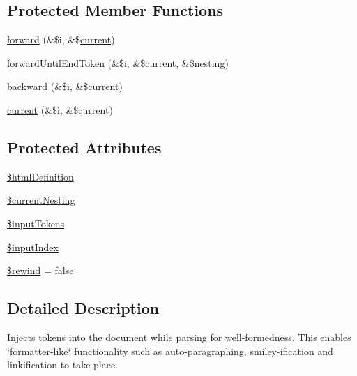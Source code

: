 \subsection*{Protected Member Functions}
\begin{DoxyCompactItemize}
\item 
\hyperlink{classHTMLPurifier__Injector_a61ac682279b37a0a88c5f58a4bbfdcea}{forward} (\&\$i, \&\$\hyperlink{classHTMLPurifier__Injector_a98838a189a21c955fe07d325edb11609}{current})
\item 
\hyperlink{classHTMLPurifier__Injector_a5d8cb8e91c94284ca4d1bad5bfb3c4e6}{forward\+Until\+End\+Token} (\&\$i, \&\$\hyperlink{classHTMLPurifier__Injector_a98838a189a21c955fe07d325edb11609}{current}, \&\$nesting)
\item 
\hyperlink{classHTMLPurifier__Injector_a7fd810083d9e19f28b07bbf3727efd76}{backward} (\&\$i, \&\$\hyperlink{classHTMLPurifier__Injector_a98838a189a21c955fe07d325edb11609}{current})
\item 
\hyperlink{classHTMLPurifier__Injector_a98838a189a21c955fe07d325edb11609}{current} (\&\$i, \&\$current)
\end{DoxyCompactItemize}
\subsection*{Protected Attributes}
\begin{DoxyCompactItemize}
\item 
\hyperlink{classHTMLPurifier__Injector_abe98d61292bba4349be8a8236ef9e255}{\$html\+Definition}
\item 
\hyperlink{classHTMLPurifier__Injector_a019ea28937cb013ced5900063253d132}{\$current\+Nesting}
\item 
\hyperlink{classHTMLPurifier__Injector_ada82e2e5701aad454e8b75b8aee6d606}{\$input\+Tokens}
\item 
\hyperlink{classHTMLPurifier__Injector_a9f43d4bd741ceaaca63bf47ff8fcf05e}{\$input\+Index}
\item 
\hyperlink{classHTMLPurifier__Injector_a0196cdb677f22f5d021fad631c785c2e}{\$rewind} = false
\end{DoxyCompactItemize}


\subsection{Detailed Description}
Injects tokens into the document while parsing for well-\/formedness. This enables \char`\"{}formatter-\/like\char`\"{} functionality such as auto-\/paragraphing, smiley-\/ification and linkification to take place.

